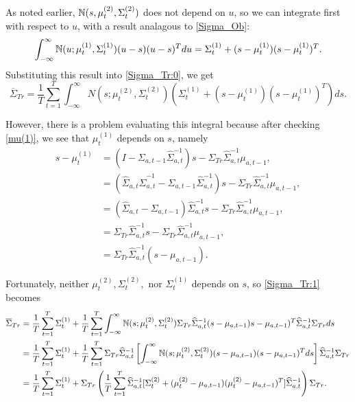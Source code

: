 \documentclass[12pt,leqno]{article}
\begin{document}
As noted earlier, ${\mathbb N}(s,\mu^{(2)}_t,\Sigma^{(2)}_t)$ does not depend on $u$, so we can integrate first with respect to $u$, with a result
analagous to \eqref{Sigma_Ob}:
$$
  \int_{-\infty}^{\infty}{\mathbb N}(u;\mu^{(1)}_t,\Sigma^{(1)}_t)(u-s)(u-s)^Tdu = \Sigma^{(1)}_t + (s-\mu^{(1)}_t)(s-\mu^{(1)}_t)^T.
$$
Substituting this result into \eqref{Sigma_Tr:0}, we get
\begin{equation}\label{Sigma_Tr:1}
  \overline{\Sigma}_{Tr} = \frac{1}{T}\sum_{t=1}^T\int_{-\infty}^{\infty}N(s;\mu^{(2)}_t,\Sigma^{(2)}_t)(\Sigma^{(1)}_t+
  (s-\mu^{(1)}_t)(s-\mu^{(1)}_t)^T)ds.
\end{equation}

However, there is a problem evaluating this integral because after checking \eqref{mu(1)}, we see that $\mu^{(1)}_t$
depends on $s$, namely  
\begin{align*}
s - \mu^{(1)}_t &= (I - \Sigma_{a,t-1}\widehat{\Sigma}_{a,t}^{-1})s - \Sigma_{Tr}\widehat{\Sigma}_{a,t}^{-1}\mu_{a,t-1}, \\
  &= (\widehat{\Sigma}_{a,t}\widehat{\Sigma}_{a,t}^{-1} - \Sigma_{a,t-1}\widehat{\Sigma}_{a,t}^{-1})s  - 
  \Sigma_{Tr}\widehat{\Sigma}_{a,t}^{-1}\mu_{a,t-1},\\
  &= (\widehat{\Sigma}_{a,t} - \Sigma_{a,t-1})\widehat{\Sigma}_{a,t}^{-1}s - \Sigma_{Tr}\widehat{\Sigma}_{a,t}^{-1}\mu_{a,t-1},\\
  &= \Sigma_{Tr}\widehat{\Sigma}_{a,t}^{-1}s - \Sigma_{Tr}\widehat{\Sigma}_{a,t}^{-1}\mu_{a,t-1},\\
  &= \Sigma_{Tr}\widehat{\Sigma}_{a,t}^{-1}(s - \mu_{a,t-1}).
\end{align*}

Fortunately, neither $\mu^{(2)}_t,\Sigma^{(2)}_t,$ nor $\Sigma^{(1)}_t$ depends on $s$, so 
\eqref{Sigma_Tr:1} becomes
\begin{align}
  \overline{\Sigma}_{Tr} &= \frac{1}{T}\sum_{t=1}^T\Sigma^{(1)}_t + \frac{1}{T}\sum_{t=1}^T
    \int_{-\infty}^{\infty}{\mathbb N}(s;\mu^{(2)}_t,\Sigma^{(2)}_t)\Sigma_{Tr}\widehat{\Sigma}_{a,t}^{-1}(s-\mu_{a,t-1})
    s-\mu_{a,t-1})^T\widehat{\Sigma}_{a,t}^{-1}\Sigma_{Tr}ds\notag\\
    &=\frac{1}{T}\sum_{t=1}^T\Sigma^{(1)}_t +\frac{1}{T}\sum_{t=1}^T\Sigma_{Tr}\widehat{\Sigma}_{a,t}^{-1}
    \left[\int_{-\infty}^{\infty}{\mathbb N}(s;\mu^{(2)}_t,\Sigma^{(2)}_t)(s-\mu_{a,t-1})(s-\mu_{a,t-1})^Tds\right]\widehat{\Sigma}_{a,t}^{-1}\Sigma_{Tr}\notag\\
   &=\frac{1}{T}\sum_{t=1}^T\Sigma^{(1)}_t+\Sigma_{Tr}\left(\frac{1}{T}\sum_{t=1}^T\widehat{\Sigma}_{a,t}^{-1}
   [\Sigma^{(2)}_t+(\mu^{(2)}_t-\mu_{a,t-1})(\mu^{(2)}_t-\mu_{a,t-1})^T]\widehat{\Sigma}_{a,t}^{-1}\right)\Sigma_{Tr}.\label{Sigma_Tr:2}
  \end{align}
\end{document}
